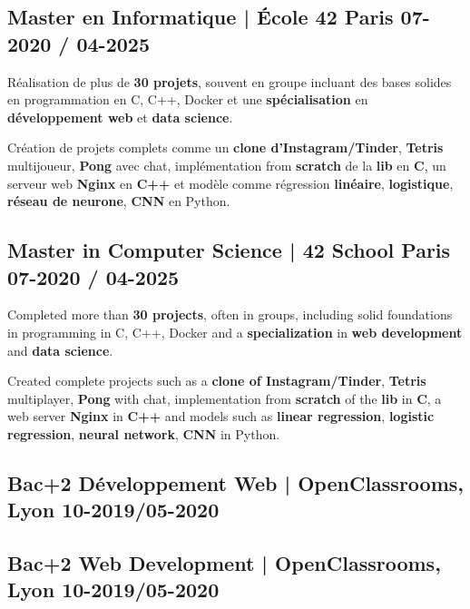 {
\subsection{{Master en Informatique  | École 42 Paris \hfill 07-2020 / 04-2025}}
\begin{zitemize}
    \item Réalisation de plus de \textbf{30 projets}, souvent en groupe incluant des bases solides en programmation en C, C++, Docker et une \textbf{spécialisation} en \textbf{développement web} et \textbf{data science}.
    \item Création de projets complets comme un \textbf{clone d’Instagram/Tinder}, \textbf{Tetris} multijoueur, \textbf{Pong} avec chat, implémentation from \textbf{scratch} de la \textbf{lib} en \textbf{C}, un serveur web \textbf{Nginx} en \textbf{C++} et modèle comme régression \textbf{linéaire}, \textbf{logistique}, \textbf{réseau de neurone}, \textbf{CNN} en Python.
\end{zitemize}
}
{
\subsection{{Master in Computer Science  | 42 School Paris \hfill 07-2020 / 04-2025}}
\begin{zitemize}
    \item Completed more than \textbf{30 projects}, often in groups, including solid foundations in programming in C, C++, Docker and a \textbf{specialization} in \textbf{web development} and \textbf{data science}.
    \item Created complete projects such as a \textbf{clone of Instagram/Tinder}, \textbf{Tetris} multiplayer, \textbf{Pong} with chat, implementation from \textbf{scratch} of the \textbf{lib} in \textbf{C}, a web server \textbf{Nginx} in \textbf{C++} and models such as \textbf{linear regression}, \textbf{logistic regression}, \textbf{neural network}, \textbf{CNN} in Python.
\end{zitemize}
}

{
\subsection{{Bac+2 Développement Web  | OpenClassrooms, Lyon \hfill 10-2019/05-2020}}
}
{
\subsection{{Bac+2 Web Development  | OpenClassrooms, Lyon \hfill 10-2019/05-2020}}
}
\\[0.5em]
